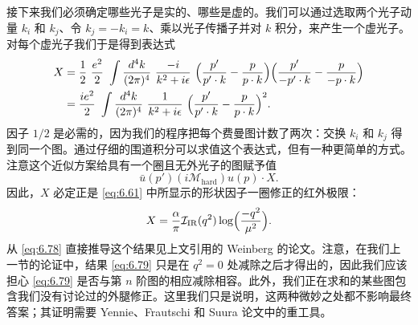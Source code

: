 接下来我们必须确定哪些光子是实的、哪些是虚的。我们可以通过选取两个光子动量 $k_i$ 和 $k_j$、令 $k_j = -k_i = k$、乘以光子传播子并对 $k$ 积分，来产生一个虚光子。对每个虚光子我们于是得到表达式
\begin{equation}
  \begin{aligned}
    X &= \frac{1}{2}\ \frac{e^2}{2}\ \int \frac{d^4k}{(2\pi)^4}\
      \frac{-i}{k^2+i\epsilon}\ \Bigl( \frac{p'}{p'\cdot k}
        - \frac{p}{p\cdot k} \Bigr)\Bigl( \frac{p'}{-p'\cdot k}
          - \frac{p}{-p\cdot k} \Bigr)\\
    &= \frac{ie^2}{2}\ \int \frac{d^4k}{(2\pi)^4}\ \frac{1}{k^2+i\epsilon}\
      \Bigl( \frac{p'}{p'\cdot k} - \frac{p}{p\cdot k} \Bigr)^2 .
  \end{aligned}
  \label{eq:6.78}
\end{equation}
因子 $1/2$ 是必需的，因为我们的程序把每个费曼图计数了两次：交换 $k_i$ 和 $k_j$ 得到同一个图。通过仔细的围道积分可以求值这个表达式，但有一种更简单的方式。注意这个近似方案给具有一个圈且无外光子的图赋予值
\begin{equation}
  \bar{u}(p')(i\mathcal{M}_{\mathrm{hard}})u(p)\cdot X .
\end{equation}
因此，$X$ 必定正是 \eqref{eq:6.61} 中所显示的形状因子一圈修正的红外极限：
\begin{equation}
  X = \frac{\alpha}{\pi}\mathcal{I}_{\mathrm{IR}}(q^2)\log\Bigl(
    \frac{-q^2}{\mu^2} \Bigr) .
  \label{eq:6.79}
\end{equation}
从 \eqref{eq:6.78} 直接推导这个结果见上文引用的 Weinberg 的论文。注意，在我们上一节的论证中，结果 \eqref{eq:6.79} 只是在 $q^2 = 0$ 处减除之后才得出的，因此我们应该担心 \eqref{eq:6.79} 是否与第 $n$ 阶图的相应减除相容。此外，我们正在求和的某些图包含我们没有讨论过的外腿修正。这里我们只是说明，这两种微妙之处都不影响最终答案；其证明需要 Yennie、Frautschi 和 Suura 论文中的重工具。

